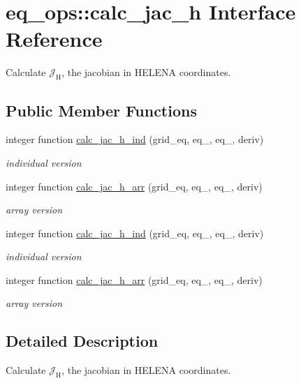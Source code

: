 \hypertarget{interfaceeq__ops_1_1calc__jac__h}{}\section{eq\+\_\+ops\+:\+:calc\+\_\+jac\+\_\+h Interface Reference}
\label{interfaceeq__ops_1_1calc__jac__h}


Calculate $\mathcal{J}_\text{H}$, the jacobian in H\+E\+L\+E\+NA coordinates.  


\subsection*{Public Member Functions}
\begin{DoxyCompactItemize}
\item 
integer function \hyperlink{interfaceeq__ops_1_1calc__jac__h_a1976fc12059af2b0da37445710dbfa68}{calc\+\_\+jac\+\_\+h\+\_\+ind} (grid\+\_\+eq, eq\+\_, eq\+\_, deriv)
\begin{DoxyCompactList}\small\item\em individual version \end{DoxyCompactList}\item 
integer function \hyperlink{interfaceeq__ops_1_1calc__jac__h_a737e7b3869d5b4e8f75ba8c704a10509}{calc\+\_\+jac\+\_\+h\+\_\+arr} (grid\+\_\+eq, eq\+\_, eq\+\_, deriv)
\begin{DoxyCompactList}\small\item\em array version \end{DoxyCompactList}\item 
integer function \hyperlink{interfaceeq__ops_1_1calc__jac__h_a1976fc12059af2b0da37445710dbfa68}{calc\+\_\+jac\+\_\+h\+\_\+ind} (grid\+\_\+eq, eq\+\_, eq\+\_, deriv)
\begin{DoxyCompactList}\small\item\em individual version \end{DoxyCompactList}\item 
integer function \hyperlink{interfaceeq__ops_1_1calc__jac__h_a737e7b3869d5b4e8f75ba8c704a10509}{calc\+\_\+jac\+\_\+h\+\_\+arr} (grid\+\_\+eq, eq\+\_, eq\+\_, deriv)
\begin{DoxyCompactList}\small\item\em array version \end{DoxyCompactList}\end{DoxyCompactItemize}


\subsection{Detailed Description}
Calculate $\mathcal{J}_\text{H}$, the jacobian in H\+E\+L\+E\+NA coordinates. 

